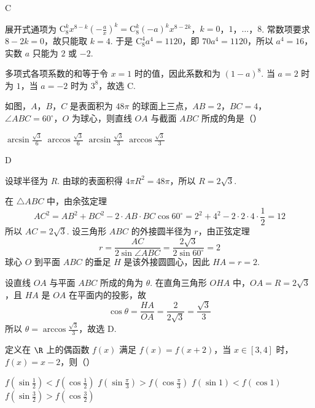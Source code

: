 \begin{answer}
C
\end{answer}

\begin{solution}
展开式通项为
\(\mathrm C_8^k x^{8-k}\left(-\frac ax\right)^k =\mathrm C_8^k(-a)^k x^{8-2k}\)，\(k=0\)，\(1\)，\(\ldots\)，\(8\).
常数项要求 \(8-2k=0\)，故只能取 \(k=4\). 于是
\(\mathrm C_8^4a^4=1120\)，即 \(70a^4=1120\)，所以 \(a^4=16\)，实数 \(a\) 只能为 \(2\) 或 \(-2\).

多项式各项系数的和等于令 \(x=1\) 时的值，因此系数和为 \((1-a)^8\). 当 \(a=2\) 时为 \(1\)，当 \(a=-2\) 时为 \(3^8\)，故选 C.
\end{solution}

\begin{problem}
如图，\(A\)，\(B\)，\(C\) 是表面积为 \(48\pi\) 的球面上三点，\(AB = 2\)，\(BC = 4\)，\(\angle ABC = 60^{\circ}\)，\(O\) 为球心，则直线 \(OA\) 与截面 \(ABC\) 所成的角是（\quad）


\choices
    {\(\arcsin \frac{\sqrt{3}}{6}\)}
    {\(\arccos \frac{\sqrt{3}}{6}\)}
    {\(\arcsin \frac{\sqrt{3}}{3}\)}
    {\(\arccos \frac{\sqrt{3}}{3}\)}
\end{problem}

\begin{answer}
D
\end{answer}

\begin{solution}
设球半径为 \(R\). 由球的表面积得
\(4\pi R^2=48\pi\)，所以 \(R=2\sqrt3\).

在 \(\triangle ABC\) 中，由余弦定理
\[
AC^2=AB^2+BC^2-2\cdot AB\cdot BC\cos60^{\circ}
=2^2+4^2-2\cdot2\cdot4\cdot\frac12=12
\]
所以 \(AC=2\sqrt3\). 设三角形 \(ABC\) 的外接圆半径为 \(r\)，由正弦定理
\[
r=\frac{AC}{2\sin\angle ABC}
=\frac{2\sqrt3}{2\sin60^{\circ}}=2
\]
球心 \(O\) 到平面 \(ABC\) 的垂足 \(H\) 是该外接圆圆心，因此 \(HA=r=2\).

设直线 \(OA\) 与平面 \(ABC\) 所成的角为 \(\theta\). 在直角三角形 \(OHA\) 中，\(OA=R=2\sqrt3\)，且 \(HA\) 是 \(OA\) 在平面内的投影，故
\[
\cos\theta=\frac{HA}{OA}=\frac{2}{2\sqrt3}=\frac{\sqrt3}{3}
\]
所以 \(\theta=\arccos\frac{\sqrt3}{3}\)，故选 D.
\end{solution}

\begin{problem}
定义在 \(\R\) 上的偶函数 \(f(x)\) 满足 \(f(x) = f(x + 2)\)，当 \(x \in [3,4]\) 时，\(f(x) = x - 2\)，则（\quad）

\choices
    {\(f\left(\sin \frac{1}{2}\right) < f\left(\cos \frac{1}{2}\right)\)}
    {\(f\left(\sin \frac{\pi}{3}\right) > f\left(\cos \frac{\pi}{3}\right)\)}
    {\(f(\sin 1) < f(\cos 1)\)}
    {\(f\left(\sin \frac{3}{2}\right) > f\left(\cos \frac{3}{2}\right)\)}
\end{problem}

